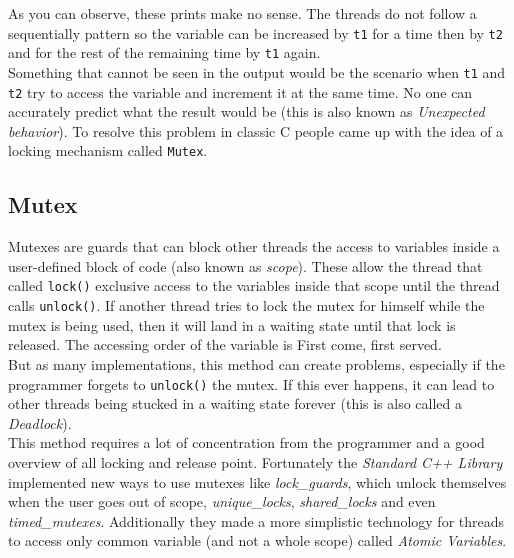 As you can observe, these prints make no sense. The threads do not follow a sequentially pattern so the variable can be increased by \texttt{t1} for a time then by \texttt{t2} and for the rest of the remaining time by \texttt{t1} again.\\
Something that cannot be seen in the output would be the scenario when \texttt{t1} and \texttt{t2} try to access the variable and increment it at the same time. No one can accurately predict what the result would be (this is also known as \textit{ Unexpected behavior}). To resolve this problem in classic C people came up with the idea of a locking mechanism called \texttt{Mutex}.\\
\subsection{Mutex}
Mutexes are guards that can block other threads the access to variables inside a user-defined block of code (also known as \textit{scope}). These allow the thread that called \texttt{lock()} exclusive access to the variables inside that scope until the thread calls \texttt{unlock()}\cite{concurrency}. If another thread tries to lock the mutex for himself while the mutex is being used, then it will land in a waiting state until that lock is released.  The accessing order of the variable is \dq First come, first served\dq{}.\\
But as many implementations, this method can create problems, especially if the programmer forgets to \texttt{unlock()} the mutex. If this ever happens, it can lead to other threads being stucked in a waiting state forever (this is also called a \textit{Deadlock})\cite{cppExpert}.\\
This method requires a lot of concentration from the programmer and a good overview of all locking and release point.
Fortunately the \textit{Standard C++ Library} implemented new ways to use mutexes like \textit{lock\_guards}, which unlock themselves when the user goes out of scope, \textit{unique\_locks}, \textit{shared\_locks} and even \textit{timed\_mutexes}. Additionally they made a more simplistic technology for threads to access only common variable (and not a whole scope) called \textit{Atomic Variables}.
